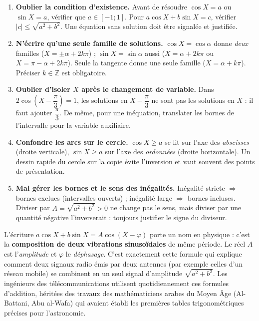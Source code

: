 \documentclass[11pt]{article}
\begin{document}
\begin{attention}
\begin{enumerate}
\item \textbf{Oublier la condition d'existence.} Avant de résoudre $\cos X=a$ ou $\sin X=a$, vérifier que $a\in[-1;1]$. Pour $a\cos X+b\sin X=c$, vérifier $|c|\leq\sqrt{a^2+b^2}$. Une équation sans solution doit être signalée et justifiée.
\item \textbf{N'écrire qu'une seule famille de solutions.} $\cos X=\cos\alpha$ donne \emph{deux} familles ($X=\pm\alpha+2k\pi$) ; $\sin X=\sin\alpha$ aussi ($X=\alpha+2k\pi$ ou $X=\pi-\alpha+2k\pi$). Seule la tangente donne une seule famille ($X=\alpha+k\pi$). Préciser $k\in\mathbb{Z}$ est obligatoire.
\item \textbf{Oublier d'isoler $X$ après le changement de variable.} Dans $2\cos\left(X-\dfrac{\pi}{3}\right)=1$, les solutions en $X-\dfrac{\pi}{3}$ ne sont pas les solutions en $X$ : il faut ajouter $\dfrac{\pi}{3}$. De même, pour une inéquation, translater les bornes de l'intervalle pour la variable auxiliaire.
\item \textbf{Confondre les arcs sur le cercle.} $\cos X\geq a$ se lit sur l'axe des \emph{abscisses} (droite verticale), $\sin X\geq a$ sur l'axe des \emph{ordonnées} (droite horizontale). Un dessin rapide du cercle sur la copie évite l'inversion et vaut souvent des points de présentation.
\item \textbf{Mal gérer les bornes et le sens des inégalités.} Inégalité stricte $\Rightarrow$ bornes exclues (intervalles ouverts) ; inégalité large $\Rightarrow$ bornes incluses. Diviser par $A=\sqrt{a^2+b^2}>0$ ne change pas le sens, mais diviser par une quantité négative l'inverserait : toujours justifier le signe du diviseur.
\end{enumerate}
\end{attention}

\begin{savaistu}
L'écriture $a\cos X+b\sin X=A\cos(X-\varphi)$ porte un nom en physique : c'est la \textbf{composition de deux vibrations sinusoïdales} de même période. Le réel $A$ est l'\emph{amplitude} et $\varphi$ le \emph{déphasage}. C'est exactement cette formule qui explique comment deux signaux radio émis par deux antennes (par exemple celles d'un réseau mobile) se combinent en un seul signal d'amplitude $\sqrt{a^2+b^2}$. Les ingénieurs des télécommunications utilisent quotidiennement ces formules d'addition, héritées des travaux des mathématiciens arabes du Moyen Âge (Al-Battani, Abu al-Wafa) qui avaient établi les premières tables trigonométriques précises pour l'astronomie.
\end{savaistu}
\end{document}
